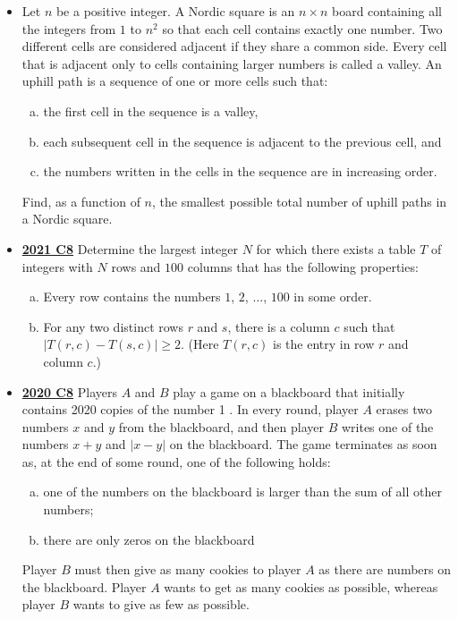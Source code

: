 \documentclass[11pt]{scrartcl}
\begin{document}
\begin{itemize}[leftmargin=*]
Determine all values of $n$ such that we can colour the whole board black.
    \item {} Let $n$ be a positive integer. A Nordic square is an $n \times n$ board containing all the integers from $1$ to $n^2$ so that each cell contains exactly one number. Two different cells are considered adjacent if they share a common side. Every cell that is adjacent only to cells containing larger numbers is called a valley. An uphill path is a sequence of one or more cells such that:
    \begin{enumerate}[(a)]
        \item the first cell in the sequence is a valley,
        \item each subsequent cell in the sequence is adjacent to the previous cell, and
        \item the numbers written in the cells in the sequence are in increasing order.
    \end{enumerate}
Find, as a function of $n$, the smallest possible total number of uphill paths in a Nordic square.
    \item \href{https://artofproblemsolving.com/community/c6h2882558p25627579}{\textbf{2021 C8}} Determine the largest integer $N$ for which there exists a table $T$ of integers with $N$ rows and $100$ columns that has the following properties:
    \begin{enumerate}[(a)]
        \item  Every row contains the numbers $1$, $2$, $\dots$, $100$ in some order.
        \item For any two distinct rows $r$ and $s$, there is a column $c$ such that $|T(r,c) - T(s, c)|\geqslant  2$. (Here $T(r,c)$ is the entry in row $r$ and column $c$.)
    \end{enumerate}

    \item \href{https://artofproblemsolving.com/community/c6h2625868p22698110}{\textbf{2020 C8}} Players $A$ and $B$ play a game on a blackboard that initially contains 2020 copies of the number 1 . In every round, player $A$ erases two numbers $x$ and $y$ from the blackboard, and then player $B$ writes one of the numbers $x+y$ and $|x-y|$ on the blackboard. The game terminates as soon as, at the end of some round, one of the following holds:
    \begin{enumerate}[(a)]
        \item one of the numbers on the blackboard is larger than the sum of all other numbers;
\item there are only zeros on the blackboard
    \end{enumerate}
Player $B$ must then give as many cookies to player $A$ as there are numbers on the blackboard. Player $A$ wants to get as many cookies as possible, whereas player $B$ wants to give as few as possible.


\end{itemize}
\end{document}
